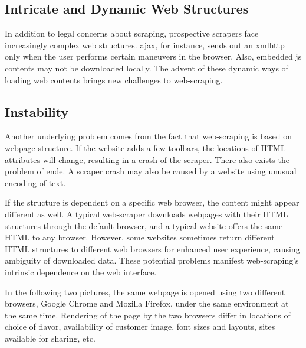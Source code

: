 \documentclass[12pt]{report}
\begin{document}
\subsection{Intricate and Dynamic Web Structures}

In addition to legal concerns about scraping, prospective scrapers face increasingly complex web structures. \gls{ajax}, for instance, sends out an \gls{xmlhttp} only when the user performs certain maneuvers in the browser. Also, embedded \gls{js} contents may not be downloaded locally. The advent of these dynamic ways of loading web contents brings new challenges to web-scraping.

\subsection{Instability}
Another underlying problem comes from the fact that web-scraping is based on webpage structure. If the website adds a few toolbars, the locations of HTML attributes will change, resulting in a crash of the scraper. There also exists the problem of \gls{ende}. A scraper crash may also be caused by a website using unusual encoding of text. 

If the structure is dependent on a specific web browser, the content might appear different as well. A typical web-scraper downloads webpages with their HTML structures through the default browser, and a typical website offers the same HTML to any browser. However, some websites sometimes return different HTML structures to different web browsers for enhanced user experience, causing ambiguity of downloaded data. These potential problems manifest web-scraping's intrinsic dependence on the web interface.

In the following two pictures, the same webpage is opened using two different browsers, Google Chrome and Mozilla Firefox, under the same environment at the same time. Rendering of the page by the two browsers differ in locations of choice of flavor, availability of customer image, font sizes and layouts, sites available for sharing, etc.
\end{document}
